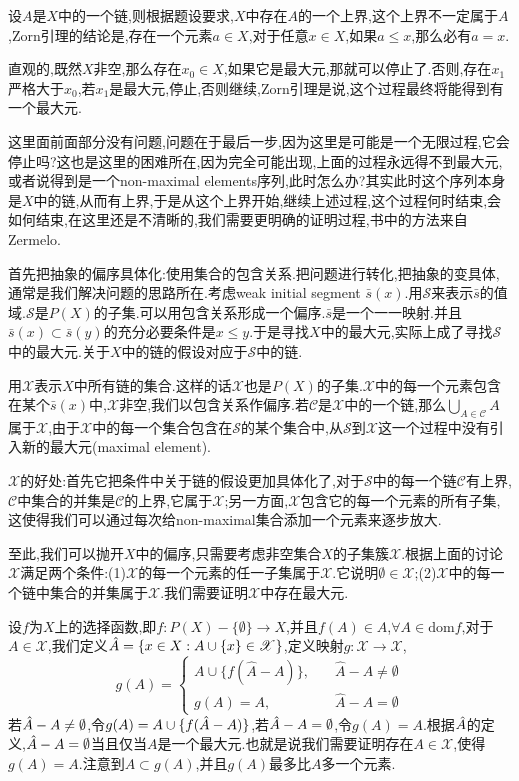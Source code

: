 \documentclass[12pt,a4paper,openany]{book}
\begin{document}
设$A$是$X$中的一个链,则根据题设要求,$X$中存在$A$的一个上界,这个上界不一定属于$A$,Zorn引理的结论是,存在一个元素$a \in X$,对于任意$x \in X$,如果$a \le x$,那么必有$a=x$.

直观的,既然$X$非空,那么存在$x_0 \in X$,如果它是最大元,那就可以停止了.否则,存在$x_1$严格大于$x_0$,若$x_1$是最大元,停止,否则继续,Zorn引理是说,这个过程最终将能得到有一个最大元.

这里面前面部分没有问题,问题在于最后一步,因为这里是可能是一个无限过程,它会停止吗?这也是这里的困难所在,因为完全可能出现,上面的过程永远得不到最大元,或者说得到是一个non-maximal elements序列,此时怎么办?其实此时这个序列本身是$X$中的链,从而有上界,于是从这个上界开始,继续上述过程,这个过程何时结束,会如何结束,在这里还是不清晰的,我们需要更明确的证明过程,书中的方法来自Zermelo.

首先把抽象的偏序具体化:使用集合的包含关系.把问题进行转化,把抽象的变具体,通常是我们解决问题的思路所在.考虑weak initial segment $\bar{s}(x)$.用$\mathscr{S}$来表示$\bar{s}$的值域.$\mathscr{S}$是$P(X)$的子集.可以用包含关系形成一个偏序.$\bar{s}$是一个一一映射.并且$\bar{s}(x) \subset \bar{s}(y)$的充分必要条件是$x \le y$.于是寻找$X$中的最大元,实际上成了寻找$\mathscr{S}$中的最大元.关于$X$中的链的假设对应于$\mathscr{S}$中的链.

用$\mathscr{X}$表示$X$中所有链的集合.这样的话$\mathscr{X}$也是$P(X)$的子集.$\mathscr{X}$中的每一个元素包含在某个$\bar{s}(x)$中,$\mathscr{X}$非空,我们以包含关系作偏序.若$\mathscr{C}$是$\mathscr{X}$中的一个链,那么$\bigcup_{A \in \mathscr{C}}{A}$属于$\mathscr{X}$,由于$\mathscr{X}$中的每一个集合包含在$\mathscr{S}$的某个集合中,从$\mathscr{S}$到$\mathscr{X}$这一个过程中没有引入新的最大元(maximal element).

$\mathscr{X}$的好处:首先它把条件中关于链的假设更加具体化了,对于$\mathscr{S}$中的每一个链$\mathscr{C}$有上界,$\mathscr{C}$中集合的并集是$\mathscr{C}$的上界,它属于$\mathscr{X}$;另一方面,$\mathscr{X}$包含它的每一个元素的所有子集,这使得我们可以通过每次给non-maximal集合添加一个元素来逐步放大.

至此,我们可以抛开$X$中的偏序,只需要考虑非空集合$X$的子集簇$\mathscr{X}$.根据上面的讨论$\mathscr{X}$满足两个条件:(1)$\mathscr{X}$的每一个元素的任一子集属于$\mathscr{X}$.它说明$\emptyset \in \mathscr{X}$;(2)$\mathscr{X}$中的每一个链中集合的并集属于$\mathscr{X}$.我们需要证明$\mathscr{X}$中存在最大元.

设$f$为$X$上的选择函数,即$f:P(X)-\{\emptyset\}\to X$,并且$f(A) \in A$,$\forall A \in \text{dom}f$,对于$A \in \mathscr{X}$,我们定义$\Hat{A}=\{x \in X: A \cup \{x\} \in \mathscr{X}\}$,定义映射$g:\mathscr{X}\to\mathscr{X}$,
\[
g(A)=\begin{cases}
A \cup \{f(\hat{A}-A)\},&\quad\hat{A}-A\neq\emptyset\\
g(A)=A,&\quad\hat{A}-A=\emptyset
\end{cases}
\]
若$\Hat{A}-A\neq\emptyset$,令$g(A)=A \cup \{f(\Hat{A}-A)\}$,若$\Hat{A}-A=\emptyset$,令$g(A)=A$.根据$\Hat{A}$的定义,$\Hat{A}-A=\emptyset$当且仅当$A$是一个最大元.也就是说我们需要证明存在$A \in \mathscr{X}$,使得$g(A)=A$.注意到$A \subset g(A)$,并且$g(A)$最多比$A$多一个元素.
\end{document}
